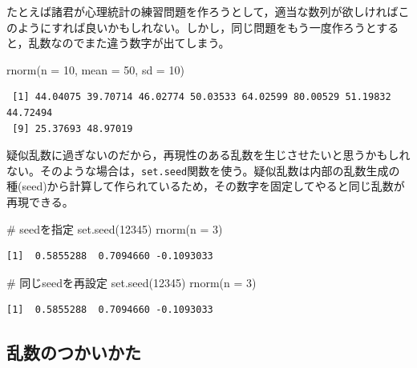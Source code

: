 \documentclass[
  a4paper,
]{ltjsbook}
\newenvironment{Shaded}{\begin{snugshade}}{\end{snugshade}}
\newcommand{\AttributeTok}[1]{\textcolor[rgb]{0.40,0.45,0.13}{#1}}
\newcommand{\CommentTok}[1]{\textcolor[rgb]{0.37,0.37,0.37}{#1}}
\newcommand{\DecValTok}[1]{\textcolor[rgb]{0.68,0.00,0.00}{#1}}
\newcommand{\FunctionTok}[1]{\textcolor[rgb]{0.28,0.35,0.67}{#1}}
\newcommand{\NormalTok}[1]{\textcolor[rgb]{0.00,0.23,0.31}{#1}}
\begin{document}
たとえば諸君が心理統計の練習問題を作ろうとして，適当な数列が欲しければこのようにすれば良いかもしれない。しかし，同じ問題をもう一度作ろうとすると，乱数なのでまた違う数字が出てしまう。

\begin{Shaded}
\begin{Highlighting}[]
\FunctionTok{rnorm}\NormalTok{(}\AttributeTok{n =} \DecValTok{10}\NormalTok{, }\AttributeTok{mean =} \DecValTok{50}\NormalTok{, }\AttributeTok{sd =} \DecValTok{10}\NormalTok{)}
\end{Highlighting}
\end{Shaded}

\begin{verbatim}
 [1] 44.04075 39.70714 46.02774 50.03533 64.02599 80.00529 51.19832 44.72494
 [9] 25.37693 48.97019
\end{verbatim}

疑似乱数に過ぎないのだから，再現性のある乱数を生じさせたいと思うかもしれない。そのような場合は，\texttt{set.seed}関数を使う。疑似乱数は内部の乱数生成の種(seed)から計算して作られているため，その数字を固定してやると同じ乱数が再現できる。

\begin{Shaded}
\begin{Highlighting}[]
\CommentTok{\# seedを指定}
\FunctionTok{set.seed}\NormalTok{(}\DecValTok{12345}\NormalTok{)}
\FunctionTok{rnorm}\NormalTok{(}\AttributeTok{n =} \DecValTok{3}\NormalTok{)}
\end{Highlighting}
\end{Shaded}

\begin{verbatim}
[1]  0.5855288  0.7094660 -0.1093033
\end{verbatim}

\begin{Shaded}
\begin{Highlighting}[]
\CommentTok{\# 同じseedを再設定}
\FunctionTok{set.seed}\NormalTok{(}\DecValTok{12345}\NormalTok{)}
\FunctionTok{rnorm}\NormalTok{(}\AttributeTok{n =} \DecValTok{3}\NormalTok{)}
\end{Highlighting}
\end{Shaded}

\begin{verbatim}
[1]  0.5855288  0.7094660 -0.1093033
\end{verbatim}

\subsection{乱数のつかいかた}\label{ux4e71ux6570ux306eux3064ux304bux3044ux304bux305f}
\end{document}

